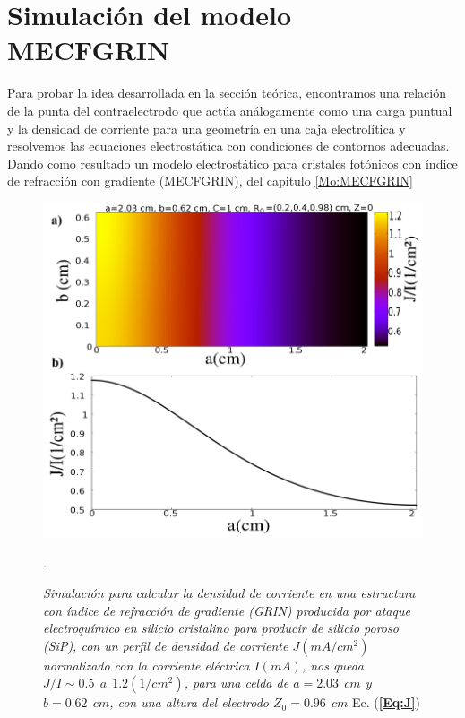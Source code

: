 \documentclass[a4paper,11pt,]{book}
\begin{document}
\section{Simulación del modelo MECFGRIN}
Para probar la idea desarrollada en la sección teórica, encontramos una relación de la punta del contraelectrodo que actúa análogamente como una carga puntual y la densidad de corriente para una geometría en una caja electrolítica y resolvemos las ecuaciones electrostática con condiciones de contornos adecuadas. Dando como resultado un modelo electrostático para cristales fotónicos con índice de refracción con gradiente (MECFGRIN), del capitulo \ref{Mo:MECFGRIN}
\begin{figure}[H]
	\centering
	\includegraphics[scale=0.45]{../Images/G123}
	\caption{\emph{Simulación para calcular la densidad de corriente en una estructura con índice de refracción de gradiente (GRIN) producida por ataque  electroquímico en silicio cristalino  para producir de silicio poroso (SiP), con un perfil de densidad de corriente $J(mA/cm^2) $ normalizado con la corriente eléctrica $I(mA)$, nos queda $J/I \sim 0.5 \ \ a \ \ 1.2 (1/cm^2) $, para una celda de $a=2.03 \ \ cm $ y $b= 0.62 \ \ cm$, con una altura del electrodo $Z_0 =0.96 \ \ cm$} Ec. (\textbf{\ref{Eq:J}})}.
	\label{fig:DR1}
\end{figure} 
\end{document}
